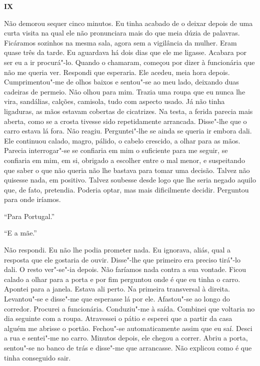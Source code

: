 \vspace*{1.8cm}
\noindent{}\textbf{IX}

\bigskip

Não demorou sequer cinco minutos. Eu tinha acabado de o deixar depois de
uma curta visita na qual ele não pronunciara mais do que meia dúzia de
palavras. Ficáramos sozinhos na mesma sala, agora sem a vigilância da
mulher. Eram quase três da tarde. Eu aguardava há dois dias que ele me
ligasse. Acabara por ser eu a ir procurá"-lo. Quando o chamaram, começou
por dizer à funcionária que não me queria ver. Respondi que esperaria.
Ele acedeu, meia hora depois. Cumprimentou"-me de olhos baixos e
sentou"-se ao meu lado, deixando duas cadeiras de permeio. Não olhou
para mim. Trazia uma roupa que eu nunca lhe vira, sandálias, calções,
camisola, tudo com aspecto usado. Já não tinha ligaduras, as mãos
estavam cobertas de cicatrizes. Na testa, a ferida parecia mais aberta,
como se a crosta tivesse sido repetidamente arrancada. Disse"-lhe que o
carro estava lá fora. Não reagiu. Perguntei"-lhe se ainda se queria ir
embora dali. Ele continuou calado, magro, pálido, o cabelo crescido, a
olhar para as mãos. Parecia interrogar"-se se confiaria em mim o
suficiente para me seguir, se confiaria em mim, em si, obrigado a
escolher entre o mal menor, e suspeitando que saber o que não queria não
lhe bastava para tomar uma decisão. Talvez não quisesse nada, em
positivo. Talvez soubesse desde logo que lhe seria negado aquilo que, de
fato, pretendia. Poderia optar, mas mais dificilmente decidir.
Perguntou para onde iríamos.

``Para Portugal.''

``E a mãe.''

Não respondi. Eu não lhe podia prometer nada. Eu ignorava, aliás, qual a
resposta que ele gostaria de ouvir. Disse"-lhe que primeiro era preciso
tirá"-lo dali. O resto ver"-se"-ia depois. Não faríamos nada contra a
sua vontade. Ficou calado a olhar para a porta e por fim perguntou onde
é que eu tinha o carro. Apontei para a janela. Estava ali perto. Na
primeira transversal à direita. Levantou"-se e disse"-me que esperasse
lá por ele. Afastou"-se ao longo do corredor. Procurei a funcionária.
Conduziu"-me à saída. Combinei que voltaria no dia seguinte com a roupa.
Atravessei o pátio e esperei que a partir da casa alguém me abrisse o
portão. Fechou"-se automaticamente assim que eu saí. Desci a rua e
sentei"-me no carro. Minutos depois, ele chegou a correr. Abriu a porta,
sentou"-se no banco de trás e disse"-me que arrancasse. Não explicou
como é que tinha conseguido sair.

